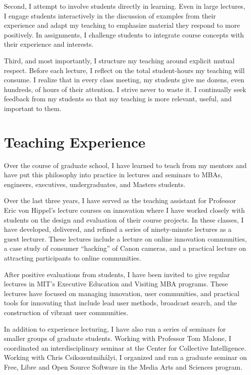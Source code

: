 \documentclass[10pt]{memoir}
\begin{document}
Second, I attempt to involve students directly in learning. Even in
large lectures, I engage students interactively in the discussion of
examples from their experience and adapt my teaching to emphasize
material they respond to more positively. In assignments, I challenge
students to integrate course concepts with their experience and
interests.

Third, and most importantly, I structure my teaching around
explicit mutual respect. Before each lecture, I reflect on the total
student-hours my teaching will consume. I realize that in every class
meeting, my students give me dozens, even hundreds, of hours of their
attention. I strive never to waste it. I continually seek feedback
from my students so that my teaching is more relevant, useful, and
important to them.

\section{Teaching Experience}

Over the course of graduate school, I have learned to teach from my
mentors and have put this philosophy into practice in lectures and
seminars to MBAs, engineers, executives, undergraduates, and Masters
students.

Over the last three years, I have served as the teaching assistant for
Professor Eric von Hippel's lecture courses on innovation where I have
worked closely with students on the design and evaluation of their
course projects. In these classes, I have developed, delivered, and
refined a series of ninety-minute lectures as a guest lecturer. These
lectures include a lecture on online innovation communities, a case
study of consumer ``hacking'' of Canon cameras, and a practical
lecture on attracting participants to online communities.

After positive evaluations from students, I have been invited to give
regular lectures in MIT's Executive Education and Visiting MBA
programs. These lectures have focused on managing innovation, user
communities, and practical tools for innovating that include lead user
methods, broadcast search, and the construction of vibrant user
communities.

In addition to experience lecturing, I have also run a series of
seminars for smaller groups of graduate students. Working with
Professor Tom Malone, I coordinated an interdisciplinary seminar at
the Center for Collective Intelligence. Working with Chris
Csikszentmihályi, I organized and ran a graduate seminar on Free,
Libre and Open Source Software in the Media Arts and Sciences program.
\end{document}

